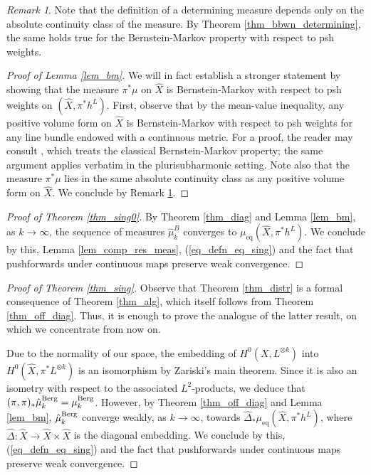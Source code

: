 \documentclass[12pt]{article}
\numberwithin{equation}{section}
\theoremstyle{theorem}
\theoremstyle{definition}
\theoremstyle{remark}
\newtheorem{rem}[thm]{Remark}
\begin{document}
	\begin{rem}\label{rem_equiv_class}
		Note that the definition of a determining measure depends only on the absolute continuity class of the measure. By Theorem \ref{thm_bbwn_determining}, the same holds true for the Bernstein-Markov property with respect to psh weights.
	\end{rem}
	\begin{proof}[Proof of Lemma \ref{lem_bm}]
		We will in fact establish a stronger statement by showing that the measure $\pi^* \mu$ on $\hat{X}$ is Bernstein-Markov with respect to psh weights on $(\hat{X}, \pi^* h^L)$.  
		First, observe that by the mean-value inequality, any positive volume form on $\hat{X}$ is Bernstein-Markov with respect to psh weights for any line bundle endowed with a continuous metric.  
		For a proof, the reader may consult \cite[Lemma 2.2]{BermanBouckBalls}, which treats the classical Bernstein-Markov property; the same argument applies verbatim in the plurisubharmonic setting.  
		Note also that the measure $\pi^* \mu$ lies in the same absolute continuity class as any positive volume form on $\hat{X}$.  
		We conclude by Remark \ref{rem_equiv_class}.
	\end{proof}
	\begin{proof}[Proof of Theorem \ref{thm_sing0}]
		By Theorem \ref{thm_diag} and Lemma \ref{lem_bm}, as $k \to \infty$, the sequence of measures $\hat{\mu}_k^B$ converges to $\mu_{\mathrm{eq}}(\hat{X}, \pi^* h^L)$.
		We conclude by this, Lemma \ref{lem_comp_res_meas}, (\ref{eq_defn_eq_sing}) and the fact that pushforwards under continuous maps preserve weak convergence.
	\end{proof}
	\begin{proof}[Proof of Theorem \ref{thm_sing}]
		Observe that Theorem \ref{thm_distr} is a formal consequence of Theorem \ref{thm_alg}, which itself follows from Theorem \ref{thm_off_diag}. 
		Thus, it is enough to prove the analogue of the latter result, on which we concentrate from now on.
		\par 
		Due to the normality of our space, the embedding of $H^0(X, L^{\otimes k})$ into $H^0(\hat{X}, \pi^* L^{\otimes k})$ is an isomorphism by Zariski's main theorem. 
		Since it is also an isometry with respect to the associated $L^2$-products, we deduce that $(\pi, \pi)_* \hat{\mu}_k^{\rm{Berg}} = \mu_k^{\rm{Berg}}$.
		However, by Theorem \ref{thm_off_diag} and Lemma \ref{lem_bm}, $\hat{\mu}_k^{\rm{Berg}}$ converge weakly, as $k \to \infty$, towards $\hat{\Delta}_* \mu_{\mathrm{eq}}(\hat{X}, \pi^* h^L)$, where $\hat{\Delta} : \hat{X} \to \hat{X} \times \hat{X}$ is the diagonal embedding.
		We conclude by this, (\ref{eq_defn_eq_sing}) and the fact that pushforwards under continuous maps preserve weak convergence.
	\end{proof}
	
	
	
	


		

\Addresses
\end{document}
